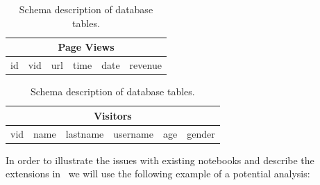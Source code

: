 \begin{table}
\begin{center}

\begin{tabular}{|c|c|c|c|c|c|}
\hline 
\multicolumn{6}{|c|}{Page Views} \\ 
\hline 
id & vid & url & time & date & revenue \\ 
\hline 
\end{tabular} 

\hfill

\begin{tabular}{|c|c|c|c|c|c|}
\hline 
\multicolumn{6}{|c|}{Visitors} \\ 
\hline 
vid & name & lastname & username & age & gender \\ 
\hline 
\end{tabular} 

\end{center}
\caption{Schema description of database tables.}
\vspace*{-30pt}
\label{tab:schema}

\end{table}


In order to illustrate the issues with existing notebooks and describe the extensions in \projname\, we will use the following example of a potential analysis:

